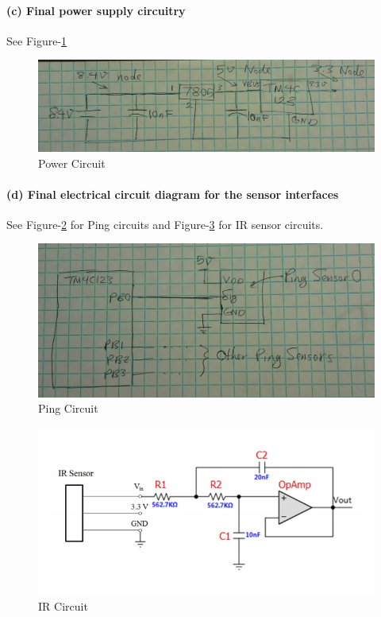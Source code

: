\documentclass[a4paper]{article}
\newlength{\pic}
\begin{document}
\paragraph{(c) Final power supply circuitry }
See Figure-\ref{pw}

\setlength{\pic}{12cm}
\begin{figure}[htp]
\center
\includegraphics[width=\pic]{circuits/Power_Circuit}
\caption{Power Circuit} \label{pw}
\end{figure}


\paragraph{(d) Final electrical circuit diagram for the sensor interfaces \\}
See Figure-\ref{ping} for Ping circuits and Figure-\ref{ir} for IR sensor circuits.

\setlength{\pic}{12cm}
\begin{figure}[htp]
\center
\includegraphics[width=\pic]{circuits/ping}
\caption{Ping Circuit} \label{ping}
\end{figure}

\setlength{\pic}{12cm}
\begin{figure}[htp]
\center
\includegraphics[width=\pic]{circuits/IR_Circuit}
\caption{IR Circuit} \label{ir}
\end{figure}
\end{document}
